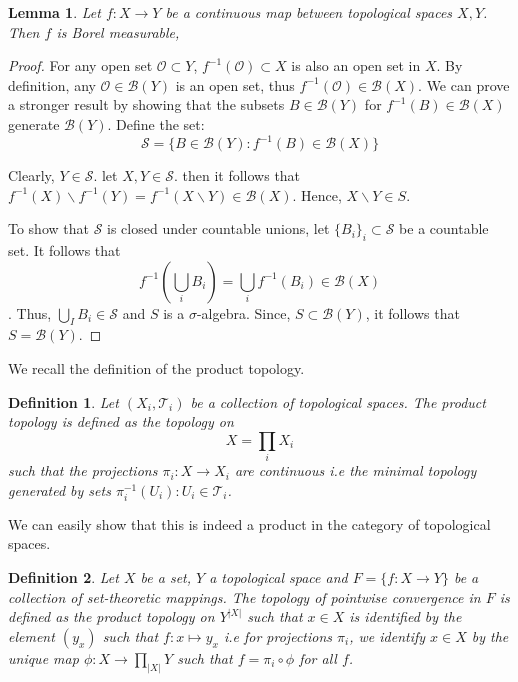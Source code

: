 \documentclass[12pt]{article}
\newtheorem{lemma}[theorem]{Lemma}
\newtheorem{definition}{Definition}[section]
\theoremstyle{remark}
\begin{document}
\begin{lemma}
Let $f: X \rightarrow Y$ be a continuous map between topological spaces $X,Y$. Then $f$ is Borel measurable,
\end{lemma}

\begin{proof}
 For any open set $\mathcal{O} \subset Y$, $f^{-1}(\mathcal{O}) \subset X$ is also an open set in $X$. By definition, any $\mathcal{O} \in \mathcal{B}(Y)$ is an open set, thus  $f^{-1}(\mathcal{O}) \in \mathcal{B}(X)$. We can prove a stronger result by showing that the subsets $B \in \mathcal{B}(Y)$ for $f^{-1}(B) \in \mathcal{B}(X)$ generate $\mathcal{B}(Y)$. Define the set:
 $$\mathcal{S} = \{ B \in \mathcal{B}(Y) : f^{-1}(B) \in \mathcal{B}(X) \} $$
 
Clearly, $Y \in \mathcal{S}$. let $X,Y \in \mathcal{S}$. then it follows that 
$f^{-1}(X) \backslash  f^{-1}(Y) = f^{-1}(X \backslash Y) \in \mathcal{B}(X)$. Hence, $X \backslash Y \in S$.

To show that $\mathcal{S}$ is closed under countable unions, let $\{B_i\}_i \subset \mathcal{S}$ be a countable set. It follows that \
$$ f^{-1}(\bigcup_i B_i) = \bigcup_i f^{-1}(B_i) \in \mathcal{B}(X) $$. Thus, 
$ \bigcup_I B_i \in \mathcal{S}$ and $S$ is a $\sigma$-algebra. Since, $S \subset \mathcal{B}(Y)$, it follows that $S = \mathcal{B}(Y)$.
\end{proof}

We recall the definition of the product topology.

\begin{definition}
Let $(X_i,\mathcal{T}_i)$ be a collection of topological spaces. The product topology is defined as the topology on 
$$ X = \prod_i X_i $$
such that the projections $\pi_i: X \rightarrow X_i$ are continuous i.e the minimal topology generated by sets $\pi_i^{-1}(U_i) : U_i \in \mathcal{T}_i$. 
\end{definition}

We can easily show that this is indeed a product in the category of topological spaces.

\begin{definition}
Let $X$ be a set, $Y$ a topological space and $F = \{f:X \rightarrow Y \}$ be a collection of set-theoretic mappings. The topology of pointwise convergence in $F$ is defined as the product topology on $Y^{|X|}$ such that $x \in X$ is identified by the element $(y_x)$ such that $f: x \mapsto y_x$ i.e for projections $\pi_i$, we identify $x \in X$ by the unique map $\phi: X \rightarrow \prod_{|X|} Y$ such that $f = \pi_i \circ \phi$ for all $f$.
\end{definition}
\end{document}

